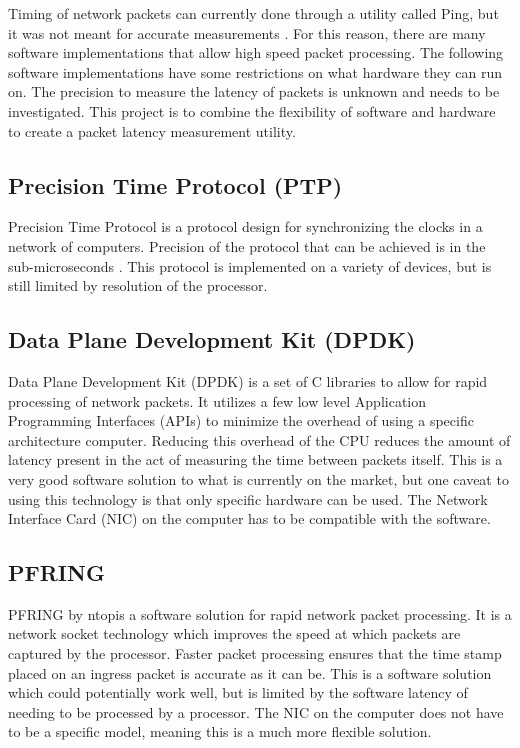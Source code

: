 \par Timing of network packets can currently done through a utility called Ping, but it was not meant for accurate measurements \cite{pingisbad}.
For this reason, there are many software implementations that allow high speed packet processing.
The following software implementations have some restrictions on what hardware they can run on.
The precision to measure the latency of packets is unknown and needs to be investigated.
This project is to combine the flexibility of software and hardware to create a packet latency measurement utility.

\subsection{Precision Time Protocol (PTP)}

Precision Time Protocol is a protocol design for synchronizing the clocks in a network of computers.
Precision of the protocol that can be achieved is in the sub-microseconds \cite{ieee1588}. 
This protocol is implemented on a variety of devices, but is still limited by resolution of the processor.

\subsection{Data Plane Development Kit (DPDK)}

\par Data Plane Development Kit (DPDK) is a set of C libraries to allow for rapid processing of network packets.
It utilizes a few low level Application Programming Interfaces (APIs) to minimize the overhead of using a specific architecture computer.
Reducing this overhead of the CPU reduces the amount of latency present in the act of measuring the time between packets itself.
This is a very good software solution to what is currently on the market, but one caveat to using this technology is that only specific hardware can be used.
The Network Interface Card (NIC) on the computer has to be compatible with the software.

\subsection{PF\textunderscore RING}

\par PF\textunderscore RING by ntop\texttrademark is a software solution for rapid network packet processing.
It is a network socket technology which improves the speed at which packets are captured by the processor.
Faster packet processing ensures that the time stamp placed on an ingress packet is accurate as it can be.
This is a software solution which could potentially work well, but is limited by the software latency of needing to be processed by a processor.
The NIC on the computer does not have to be a specific model, meaning this is a much more flexible solution.


